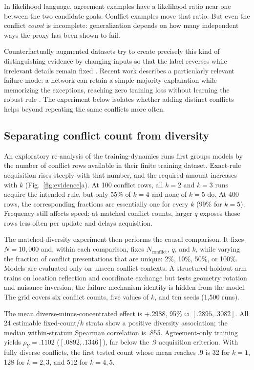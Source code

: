 \documentclass[11pt,a4paper]{article}
\newcommand{\rhoY}{\rho_Y}
\newcommand{\CI}{\textsc{ci}}
\newcommand{\fig}[1]{Fig.~\ref{#1}}
\begin{document}
In likelihood language, agreement examples have a likelihood ratio near one between the two candidate goals. Conflict examples move that ratio. But even the conflict \emph{count} is incomplete: generalization depends on how many independent ways the proxy has been shown to fail.

Counterfactually augmented datasets try to create precisely this kind of distinguishing evidence by changing inputs so that the label reverses while irrelevant details remain fixed \citep{kaushik2020difference}. Recent work describes a particularly relevant failure mode: a network can retain a simple majority explanation while memorizing the exceptions, reaching zero training loss without learning the robust rule \citep{bayat2025pitfalls}. The experiment below isolates whether adding distinct conflicts helps beyond repeating the same conflicts more often.

\subsection*{Separating conflict count from diversity}

An exploratory re-analysis of the training-dynamics runs first groups models by the number of conflict rows available in their finite training dataset. Exact-rule acquisition rises steeply with that number, and the required amount increases with $k$ (\fig{fig:evidence}a). At 100 conflict rows, all $k=2$ and $k=3$ runs acquire the intended rule, but only 55\% of $k=4$ and none of $k=5$ do. At 400 rows, the corresponding fractions are essentially one for every $k$ (99\% for $k=5$). Frequency still affects speed: at matched conflict counts, larger $q$ exposes those rows less often per update and delays acquisition.

The matched-diversity experiment then performs the causal comparison. It fixes $N=10{,}000$ and, within each comparison, fixes $N_{\mathrm{conflict}}$, $q$, and $k$, while varying the fraction of conflict presentations that are unique: 2\%, 10\%, 50\%, or 100\%. Models are evaluated only on unseen conflict contexts. A structured-holdout arm trains on location reflection and coordinate exchange but tests geometry rotation and nuisance inversion; the failure-mechanism identity is hidden from the model. The grid covers six conflict counts, five values of $k$, and ten seeds (1,500 runs).

The mean diverse-minus-concentrated effect is +.2988, 95\% \CI{} $[.2895,.3082]$. All 24 estimable fixed-count/$k$ strata show a positive diversity association; the median within-stratum Spearman correlation is .855. Agreement-only training yields $\rhoY=.1102$ ($[.0892,.1346]$), far below the .9 acquisition criterion. With fully diverse conflicts, the first tested count whose mean reaches .9 is 32 for $k=1$, 128 for $k=2,3$, and 512 for $k=4,5$.
\end{document}
